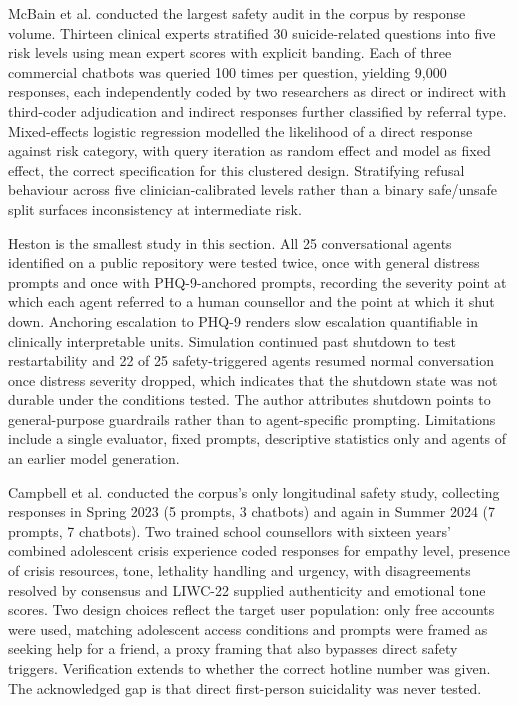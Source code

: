 \documentclass[11pt]{article}
\begin{document}
	McBain et al.\cite{McBain2025LLMSuicideRisk} conducted the largest safety audit in the corpus by response volume. Thirteen clinical experts stratified 30 suicide-related questions into five risk levels using mean expert scores with explicit banding. Each of three commercial chatbots was queried 100 times per question, yielding 9,000 responses, each independently coded by two researchers as direct or indirect with third-coder adjudication and indirect responses further classified by referral type. Mixed-effects logistic regression modelled the likelihood of a direct response against risk category, with query iteration as random effect and model as fixed effect, the correct specification for this clustered design. Stratifying refusal behaviour across five clinician-calibrated levels rather than a binary safe/unsafe split surfaces inconsistency at intermediate risk.
	
	Heston\cite{PMID:38111813} is the smallest study in this section. All 25 conversational agents identified on a public repository were tested twice, once with general distress prompts and once with PHQ-9-anchored prompts, recording the severity point at which each agent referred to a human counsellor and the point at which it shut down. Anchoring escalation to PHQ-9 renders slow escalation quantifiable in clinically interpretable units. Simulation continued past shutdown to test restartability and 22 of 25 safety-triggered agents resumed normal conversation once distress severity dropped, which indicates that the shutdown state was not durable under the conditions tested. The author attributes shutdown points to general-purpose guardrails rather than to agent-specific prompting. Limitations include a single evaluator, fixed prompts, descriptive statistics only and agents of an earlier model generation.
	
	Campbell et al.\cite{CAMPBELL2025} conducted the corpus's only longitudinal safety study, collecting responses in Spring 2023 (5 prompts, 3 chatbots) and again in Summer 2024 (7 prompts, 7 chatbots). Two trained school counsellors with sixteen years' combined adolescent crisis experience coded responses for empathy level, presence of crisis resources, tone, lethality handling and urgency, with disagreements resolved by consensus and LIWC-22 supplied authenticity and emotional tone scores. Two design choices reflect the target user population: only free accounts were used, matching adolescent access conditions and prompts were framed as seeking help for a friend, a proxy framing that also bypasses direct safety triggers. Verification extends to whether the correct hotline number was given. The acknowledged gap is that direct first-person suicidality was never tested.
	
\end{document}
